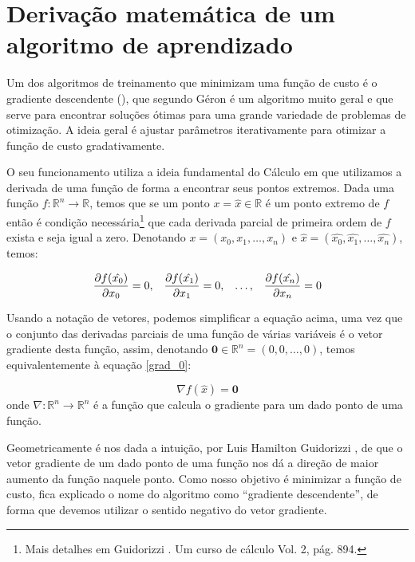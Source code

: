 \section{Derivação matemática de um algoritmo de aprendizado}

Um dos algoritmos de treinamento que minimizam uma função de custo é o gradiente descendente (), que segundo Géron \citep{hands} é um algoritmo muito geral e que serve para encontrar soluções ótimas para uma grande variedade de problemas de otimização. A ideia geral é ajustar parâmetros iterativamente para otimizar a função de custo gradativamente.

O seu funcionamento utiliza a ideia fundamental do Cálculo em que utilizamos a derivada de uma função de forma a encontrar seus pontos extremos. Dada uma função $f{:}\mathbb{R}^n \rightarrow \mathbb{R}$, temos que se um ponto $x = \hat{x} \in \mathbb{R}$ é um ponto extremo de $f$ então é condição necessária\footnote{Mais detalhes em Guidorizzi \citep{guidorizzi2}. Um curso de cálculo Vol. 2, pág. 894.} que cada derivada parcial de primeira ordem de $f$ exista e seja igual a zero. Denotando $x = (x_0, x_1, \ldots, x_n)$ e $\hat{x} = (\hat{x_0}, \hat{x_1}, \ldots, \hat{x_n})$, temos:

\begin{equation}\label{grad_0}
\frac{\partial f(\hat{x_0})}{\partial x_0} = 0 ,\;\;\; \frac{\partial f(\hat{x_1})}{\partial x_1} = 0 ,\;\;\; \ldots ,\;\;\; \frac{\partial f(\hat{x_n})}{\partial x_n} = 0
\end{equation}

Usando a notação de vetores, podemos simplificar a equação acima, uma vez que o conjunto das derivadas parciais de uma função de várias variáveis é o vetor gradiente desta função, assim, denotando $\mathbf{0} \in \mathbb{R}^n = (0, 0, \ldots, 0)$, temos equivalentemente à equação \ref{grad_0}:

\begin{equation}\label{grad_1}
\nabla f(\hat{x}) = \mathbf{0}
\end{equation}
onde $\nabla{:}\mathbb{R}^n \rightarrow \mathbb{R}^n$ é a função que calcula o gradiente para um dado ponto de uma função.

Geometricamente é nos dada a intuição, por Luis Hamilton Guidorizzi \citep{guidorizzi2}, de que o vetor gradiente de um dado ponto de uma função nos dá a direção de maior aumento da função naquele ponto. Como nosso objetivo é minimizar a função de custo, fica explicado o nome do algoritmo como ``gradiente descendente'', de forma que devemos utilizar o sentido negativo do vetor gradiente.

